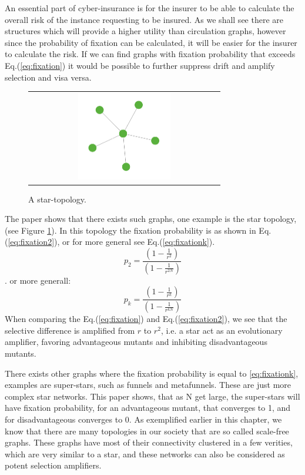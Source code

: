 An essential part of cyber-insurance is for the insurer to be able to calculate the overall risk of the instance requesting to be insured. 
As we shall see there are structures which will provide a higher utility than circulation graphs, however since the probability of fixation can be calculated, it will be easier for the insurer to calculate the risk. If we can find graphs with fixation probability that exceeds Eq.(\ref{eq:fixation}) it would be possible to further suppress drift and amplify selection and visa versa. 
\begin{figure}[b]
\centering
\begin{tabular}{@{}c@{}}
\includegraphics[width=0.5\textwidth]{../Figures/aStar.png}
\end{tabular}
\caption{
\label{fig:star} A star-topology. 
}
\end{figure}
The paper shows that there exists such graphs, one example is the star topology, (see Figure \ref{fig:star}).
In this topology the fixation probability is as shown in Eq.(\ref{eq:fixation2}), or for more general see Eq.(\ref{eq:fixationk}). \begin{equation}p_{2}=\frac{(1-\frac{1}{r^{2}})}{(1-\frac{1}{r^{2N}})} \label{eq:fixation2} \end{equation}.
or more generall: \begin{equation}
p_{k}=\frac{(1-\frac{1}{r^{k}})}{(1-\frac{1}{r^{kN}})} \label{eq:fixationk}
\end{equation}
 When comparing the Eq.(\ref{eq:fixation}) and Eq.(\ref{eq:fixation2}), we see that the selective difference is
 amplified from $r$ to $r^{2}$, i.e. a star act as an evolutionary amplifier, favoring advantageous
  mutants and inhibiting disadvantageous mutants.

There exists other graphs where the fixation probability is equal to \ref{eq:fixationk}, examples are super-stars, such as funnels and
metafunnels. These are just more complex star networks. This paper shows, that as N get large, the super-stars will have fixation probability, for an advantageous mutant, that converges to 1, and for disadvantageous converges to 0. 
As exemplified earlier in this chapter, we know that there are many
topologies in our society that are so called scale-free graphs. These graphs have most of their connectivity clustered in a few verities, which are very similar to a star, and these networks can also be considered as potent selection amplifiers. 


